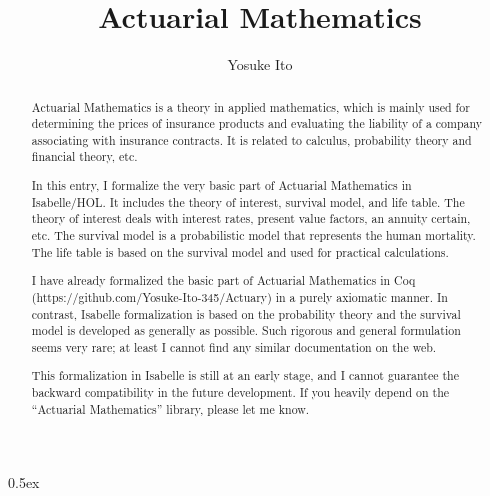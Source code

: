 \documentclass[11pt,a4paper]{article}
\begin{document}
\title{Actuarial Mathematics}
\author{Yosuke Ito}
\maketitle

\begin{abstract}
  Actuarial Mathematics is a theory in applied mathematics,
  which is mainly used for determining the prices of insurance products
  and evaluating the liability of a company associating with insurance contracts.
  It is related to calculus, probability theory and financial theory, etc.

  In this entry, I formalize the very basic part of Actuarial Mathematics in Isabelle/HOL.
  It includes the theory of interest, survival model, and life table.
  The theory of interest deals with interest rates, present value factors, an annuity certain, etc.
  The survival model is a probabilistic model that represents the human mortality.
  The life table is based on the survival model and used for practical calculations.

  I have already formalized the basic part of Actuarial Mathematics in Coq
  (https://github.com/Yosuke-Ito-345/Actuary) in a purely axiomatic manner.
  In contrast, Isabelle formalization is based on the probability theory
  and the survival model is developed as generally as possible.
  Such rigorous and general formulation seems very rare;
  at least I cannot find any similar documentation on the web.

  This formalization in Isabelle is still at an early stage,
  and I cannot guarantee the backward compatibility in the future development.
  If you heavily depend on the ``Actuarial Mathematics'' library, please let me know.
\end{abstract}

\tableofcontents

\parindent 0pt\parskip 0.5ex



%
%
\end{document}
